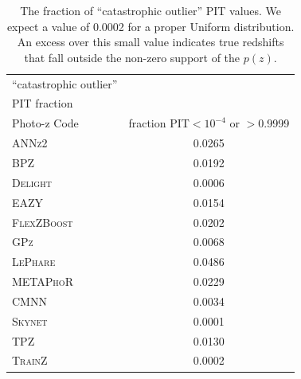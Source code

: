 \documentclass[usenatbib]{mn2e}
\begin{document}
\begin{table}
\setlength{\tabcolsep}{2pt}
\centering
\caption{The fraction of ``catastrophic outlier'' PIT values.  We expect a value of 0.0002 for a proper Uniform distribution.  An excess over this small value indicates true redshifts that fall outside the non-zero support of the $p(z)$.  }\label{tab:pitoutlier}
\begin{tabular}{lc}
\hline
\hline
 ``catastrophic outlier''\\ PIT fraction\\
\hline
Photo-z Code & fraction PIT$<10^{-4}$ or $>$0.9999\\
\hline
\textsc{ANNz2} & 0.0265\\
\textsc{BPZ} & 0.0192\\
\textsc{Delight} & 0.0006\\
\textsc{EAZY} & 0.0154\\ 
\textsc{FlexZBoost} & 0.0202\\
\textsc{GPz} & 0.0068\\ 
\textsc{LePhare} & 0.0486\\
\textsc{METAPhoR}& 0.0229\\
\textsc{CMNN} & 0.0034\\ 
\textsc{Skynet} & 0.0001\\  
\textsc{TPZ} & 0.0130\\
\hline
\textsc{TrainZ} & 0.0002\\
\end{tabular}
\end{table}
\end{document}
